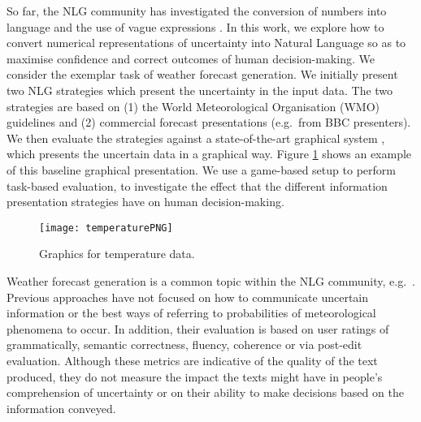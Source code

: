 \documentclass[11pt]{article}
\begin{document}


So far, the NLG community has investigated the conversion of numbers into language \cite{power:12} and the use of vague expressions \cite{vanDeemter2009}.
In this work, we explore how to convert numerical representations of uncertainty into Natural Language so as to maximise confidence and correct outcomes of human decision-making. We consider the exemplar task of weather forecast generation. We initially present two NLG strategies which present the uncertainty in the input data. The two strategies are based on (1) the World Meteorological Organisation (WMO) \cite{WMO:2008} guidelines and (2) commercial forecast presentations (e.g.\ from BBC   presenters). We then evaluate the  strategies against a state-of-the-art graphical system \cite{Stephens2011}, which presents the uncertain data in a graphical way.  Figure \ref{fig:screenshot:temp} shows an example of this baseline graphical presentation.
We use a game-based setup %
  \cite{gkatzia-EtAl:2015:ENLG} to perform task-based evaluation,  to investigate the effect that the different information presentation strategies have on human decision-making.

\begin{figure}[t]
    \centering
    \texttt{[image: temperaturePNG]}
    \caption{Graphics for temperature data.}
    \label{fig:screenshot:temp}
\end{figure}


Weather forecast generation is a common topic within the NLG community, e.g.\ 
 \cite{Konstas2012,Angeli2010,BelzKow2010,Sripada2005}. Previous approaches have not focused on how to communicate uncertain information or %
  the best ways of referring to probabilities of meteorological phenomena to occur. In addition, their evaluation is %
   based on user ratings of grammatically, semantic correctness, fluency, coherence or via post-edit evaluation. Although these metrics are indicative of the quality of the text produced, they do not measure the impact the texts might have in people's comprehension of uncertainty or on their ability to make decisions based on the information conveyed. 
\end{document}
